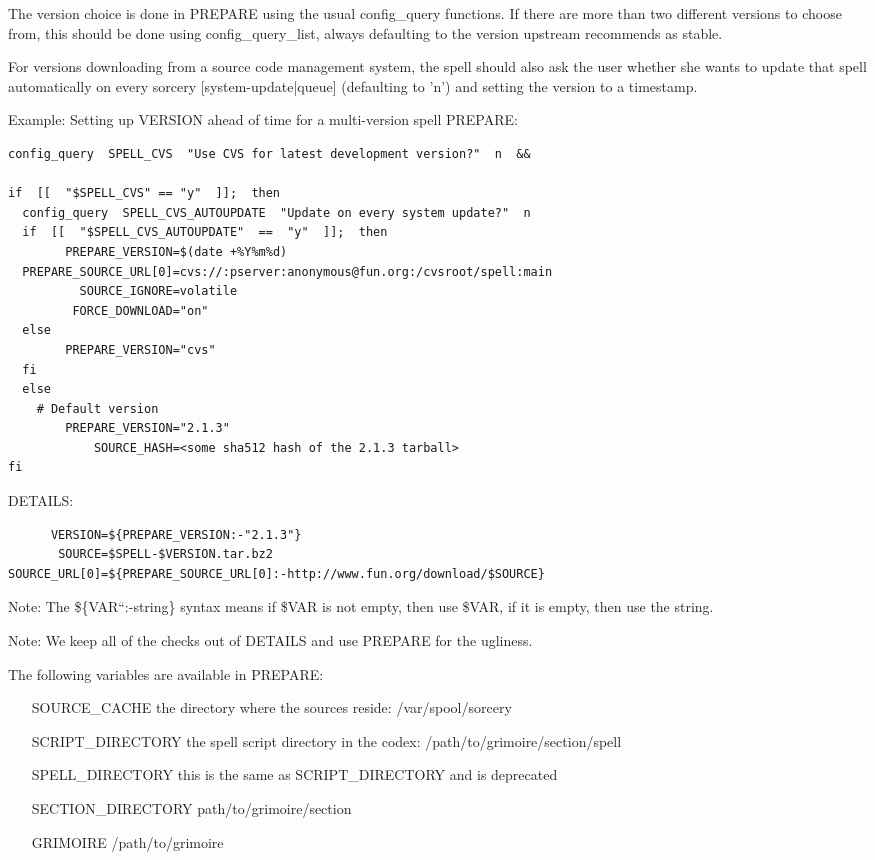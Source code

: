 \documentclass[a4paper,10pt]{book}
\begin{document}
The version choice is done in PREPARE using the usual config\_query functions.
If there are more than two different versions to choose from, this should be
done using config\_query\_list, always defaulting to the version upstream
recommends as stable.

For versions downloading from a source code management system, the spell should
also ask the user whether she wants to update that spell automatically on every
sorcery [system-update|queue] (defaulting to 'n') and setting the version to
a timestamp.

Example: Setting up VERSION ahead of time for a multi-version spell
PREPARE:
\begin{verbatim}
config_query  SPELL_CVS  "Use CVS for latest development version?"  n  &&

if  [[  "$SPELL_CVS" == "y"  ]];  then
  config_query  SPELL_CVS_AUTOUPDATE  "Update on every system update?"  n
  if  [[  "$SPELL_CVS_AUTOUPDATE"  ==  "y"  ]];  then
        PREPARE_VERSION=$(date +%Y%m%d)
  PREPARE_SOURCE_URL[0]=cvs://:pserver:anonymous@fun.org:/cvsroot/spell:main
          SOURCE_IGNORE=volatile
         FORCE_DOWNLOAD="on"
  else
        PREPARE_VERSION="cvs"
  fi
  else
    # Default version
        PREPARE_VERSION="2.1.3"
            SOURCE_HASH=<some sha512 hash of the 2.1.3 tarball>
fi
\end{verbatim}

DETAILS:
\begin{verbatim}
      VERSION=${PREPARE_VERSION:-"2.1.3"}
       SOURCE=$SPELL-$VERSION.tar.bz2
SOURCE_URL[0]=${PREPARE_SOURCE_URL[0]:-http://www.fun.org/download/$SOURCE}
\end{verbatim}

Note: The \$\{VAR``:-string\}  syntax means if \$VAR is not empty, then use
\$VAR, if it is empty, then use the string.

Note: We keep all of the checks out of DETAILS and use PREPARE for the
ugliness.

The following variables are available in PREPARE:
\begin{itemize}
\item[SOURCE\_CACHE] the directory where the sources reside:
/var/spool/sorcery
\item[SCRIPT\_DIRECTORY] the spell script directory in the codex:
/path/to/grimoire/section/spell
\item[SPELL\_DIRECTORY] this is the same as \textdollar SCRIPT\_DIRECTORY and
is deprecated
\item[SECTION\_DIRECTORY] path/to/grimoire/section
\item[GRIMOIRE] /path/to/grimoire
\end{itemize}
\end{document}
